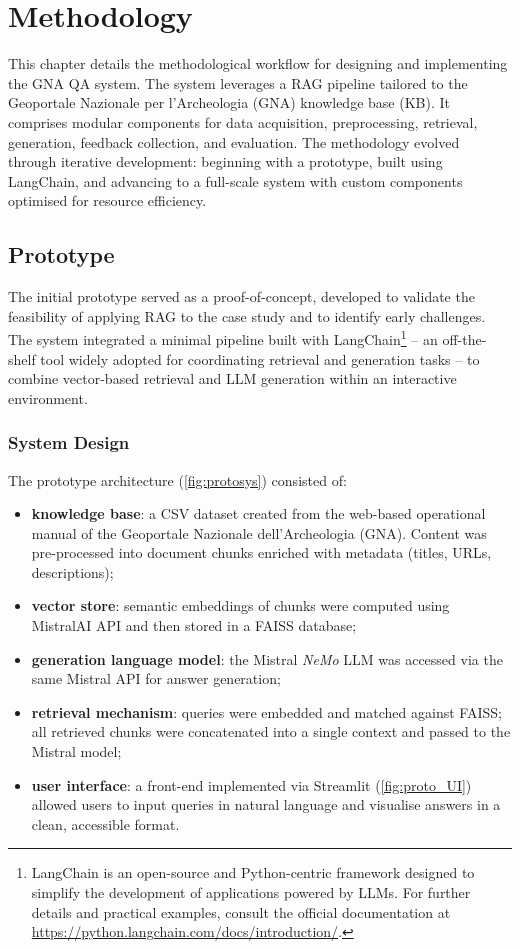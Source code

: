 \chapter{Methodology}
\label{chap:methodology}
\begin{spacing}{1.5}
This chapter details the methodological workflow for designing and implementing the GNA QA system. The system leverages a RAG pipeline tailored to the Geoportale Nazionale per l’Archeologia (GNA) knowledge base (KB). It comprises modular components for data acquisition, preprocessing, retrieval, generation, feedback collection, and evaluation. The methodology evolved through iterative development: beginning with a prototype, built using LangChain, and advancing to a full-scale system with custom components optimised for resource efficiency.


\section{Prototype}
The initial prototype served as a proof-of-concept, developed to validate the feasibility of applying RAG to the case study and to identify early challenges. The system integrated a minimal pipeline built with LangChain\footnote{LangChain is an open-source and Python-centric framework designed to simplify the development of applications powered by LLMs. For further details and practical examples, consult the official documentation at \url{https://python.langchain.com/docs/introduction/}.}\nocite{noauthor_langchain_2024} -- an off-the-shelf tool widely adopted for coordinating retrieval and generation tasks \citep{mishra_using_2024,akkiraju_facts_2024} -- to combine vector-based retrieval and LLM generation within an interactive environment.

\subsection{System Design}
The prototype architecture (\autoref{fig:protosys}) consisted of:
\begin{itemize}
      \item \textbf{knowledge base}: a CSV dataset created from the web-based operational manual of the Geoportale Nazionale dell’Archeologia (GNA). Content was pre-processed into document chunks enriched with metadata (titles, URLs, descriptions);
      \item \textbf{vector store}: semantic embeddings of chunks were computed using MistralAI API and then stored in a FAISS database;
      \item \textbf{generation language model}: the Mistral \textit{NeMo} LLM was accessed via the same Mistral API for answer generation;
      \item \textbf{retrieval mechanism}: queries were embedded and matched against FAISS; all retrieved chunks were concatenated into a single context and passed to the Mistral model;
      \item \textbf{user interface}: a front-end implemented via Streamlit (\autoref{fig:proto_UI}) allowed users to input queries in natural language and visualise answers in a clean, accessible format.
\end{itemize}



\end{spacing}
